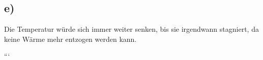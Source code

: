

\subsection*{e)}

Die Temperatur würde sich immer weiter senken, bis sie irgendwann stagniert, da keine Wärme mehr entzogen werden kann.

```